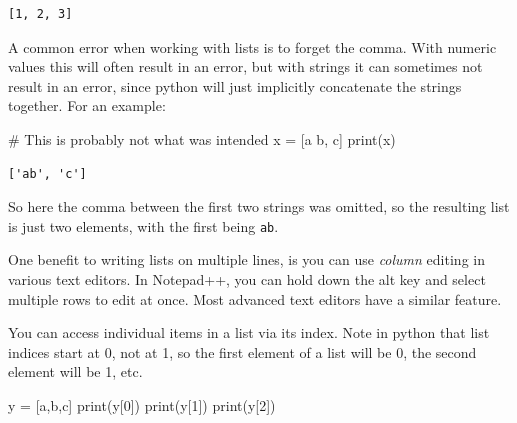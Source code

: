 \documentclass[
  letterpaper,
]{scrbook}
\newenvironment{Shaded}{\begin{snugshade}}{\end{snugshade}}
\newcommand{\BuiltInTok}[1]{\textcolor[rgb]{0.00,0.23,0.31}{#1}}
\newcommand{\CommentTok}[1]{\textcolor[rgb]{0.37,0.37,0.37}{#1}}
\newcommand{\DecValTok}[1]{\textcolor[rgb]{0.68,0.00,0.00}{#1}}
\newcommand{\NormalTok}[1]{\textcolor[rgb]{0.00,0.23,0.31}{#1}}
\newcommand{\OperatorTok}[1]{\textcolor[rgb]{0.37,0.37,0.37}{#1}}
\newcommand{\StringTok}[1]{\textcolor[rgb]{0.13,0.47,0.30}{#1}}
\begin{document}
\begin{verbatim}
[1, 2, 3]
\end{verbatim}

A common error when working with lists is to forget the comma. With
numeric values this will often result in an error, but with strings it
can sometimes not result in an error, since python will just implicitly
concatenate the strings together. For an example:

\begin{Shaded}
\begin{Highlighting}[]
\CommentTok{\# This is probably not what was intended}
\NormalTok{x }\OperatorTok{=}\NormalTok{ [}\StringTok{\textquotesingle{}a\textquotesingle{}} \StringTok{\textquotesingle{}b\textquotesingle{}}\NormalTok{, }\StringTok{\textquotesingle{}c\textquotesingle{}}\NormalTok{]}
\BuiltInTok{print}\NormalTok{(x)}
\end{Highlighting}
\end{Shaded}

\begin{verbatim}
['ab', 'c']
\end{verbatim}

So here the comma between the first two strings was omitted, so the
resulting list is just two elements, with the first being
\texttt{\textquotesingle{}ab\textquotesingle{}}.

\begin{tcolorbox}[enhanced jigsaw, toprule=.15mm, rightrule=.15mm, arc=.35mm, opacityback=0, coltitle=black, bottomrule=.15mm, left=2mm, opacitybacktitle=0.6, bottomtitle=1mm, colback=white, colframe=quarto-callout-note-color-frame, colbacktitle=quarto-callout-note-color!10!white, titlerule=0mm, breakable, title={Note}, toptitle=1mm, leftrule=.75mm]

One benefit to writing lists on multiple lines, is you can use
\emph{column} editing in various text editors. In Notepad++, you can
hold down the alt key and select multiple rows to edit at once. Most
advanced text editors have a similar feature.

\end{tcolorbox}

You can access individual items in a list via its index. Note in python
that list indices start at 0, not at 1, so the first element of a list
will be 0, the second element will be 1, etc.

\begin{Shaded}
\begin{Highlighting}[]
\NormalTok{y }\OperatorTok{=}\NormalTok{ [}\StringTok{\textquotesingle{}a\textquotesingle{}}\NormalTok{,}\StringTok{\textquotesingle{}b\textquotesingle{}}\NormalTok{,}\StringTok{\textquotesingle{}c\textquotesingle{}}\NormalTok{]}
\BuiltInTok{print}\NormalTok{(y[}\DecValTok{0}\NormalTok{])}
\BuiltInTok{print}\NormalTok{(y[}\DecValTok{1}\NormalTok{])}
\BuiltInTok{print}\NormalTok{(y[}\DecValTok{2}\NormalTok{])}
\end{Highlighting}
\end{Shaded}
\end{document}
